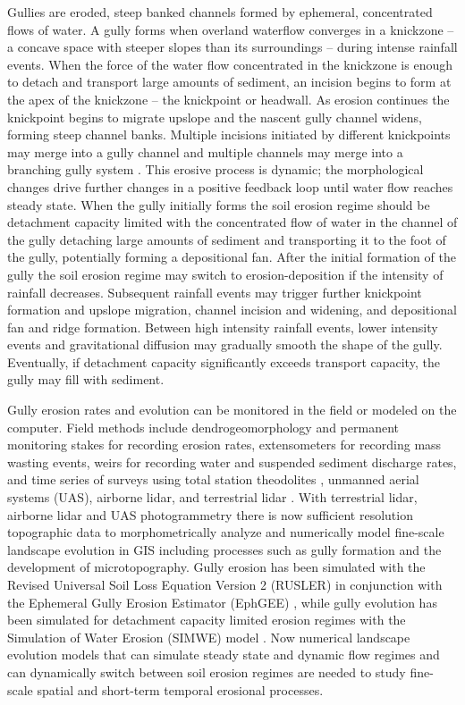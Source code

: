 \documentclass[gmd, manuscript]{copernicus}
\begin{document}
Gullies are eroded, steep banked channels 
formed by ephemeral, concentrated flows of water.
A gully forms when overland waterflow
converges in a knickzone
-- a concave space with steeper slopes than its surroundings 
\citep{Zahra2017} -- 
during intense rainfall events.  
When the force of the water flow concentrated in the knickzone
is enough to detach and transport large amounts of sediment,
an incision begins to form at the apex of the knickzone 
-- the knickpoint or headwall.
As erosion continues the knickpoint begins to migrate upslope
and the nascent gully channel widens,
forming steep channel banks. 
Multiple incisions initiated by different knickpoints 
may merge into a gully channel
and multiple channels may merge into a branching gully system \citep{Mitasova2013}. 
This erosive process is dynamic; 
the morphological changes drive further changes 
in a positive feedback loop
until water flow reaches steady state. 
When the gully initially forms 
the soil erosion regime should be detachment capacity limited
with the concentrated flow of water in the channel of the gully 
detaching large amounts of sediment and transporting it to the foot of the gully, 
potentially forming a depositional fan. 
After the initial formation of the gully
the soil erosion regime may switch
to erosion-deposition if the intensity of rainfall decreases.
Subsequent rainfall events may trigger further 
knickpoint formation and upslope migration, 
channel incision and widening, and
depositional fan and ridge formation. 
Between high intensity rainfall events, 
lower intensity events and gravitational diffusion
may gradually smooth the shape of the gully. 
Eventually, if detachment capacity 
significantly exceeds transport capacity, 
the gully may fill with sediment. 

Gully erosion rates and evolution
can be monitored in the field 
or modeled on the computer. 
Field methods include
dendrogeomorphology \citep{Malik2008} and 
permanent monitoring stakes for recording erosion rates, 
extensometers for recording mass wasting events, 
weirs for recording water and suspended sediment discharge rates, 
and time series of surveys using 
total station theodolites \citep{Thomas2004},
unmanned aerial systems (UAS),
airborne lidar, and terrestrial lidar \citep{Starek2011,Bechet2016}.
With terrestrial lidar, airborne lidar and 
UAS photogrammetry
there is now sufficient resolution topographic data 
to morphometrically analyze and 
numerically model fine-scale landscape evolution in GIS
including processes such as gully formation 
and the development of microtopography. 
Gully erosion has been simulated with 
the Revised Universal Soil Loss Equation Version 2 (RUSLER)
in conjunction with the Ephemeral Gully Erosion Estimator (EphGEE)
\citep{Dabney2014},
while gully evolution
has been simulated for detachment capacity limited erosion regimes
with the Simulation of Water Erosion (SIMWE) model
\citep{Koco2011, Mitasova2013}. 
Now numerical landscape evolution models 
that can simulate 
steady state and dynamic flow regimes
and can dynamically switch between soil erosion regimes 
are needed to study 
fine-scale spatial and short-term temporal erosional processes.
\end{document}
